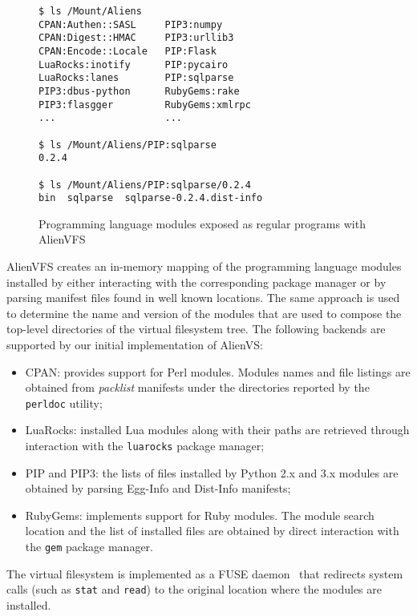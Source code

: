 \documentclass[sigplan, anonymous, 10pt]{acmart}
\begin{document}
\begin{figure}
    \begin{Verbatim}[frame=single]
$ ls /Mount/Aliens
CPAN:Authen::SASL     PIP3:numpy
CPAN:Digest::HMAC     PIP3:urllib3
CPAN:Encode::Locale   PIP:Flask
LuaRocks:inotify      PIP:pycairo
LuaRocks:lanes        PIP:sqlparse
PIP3:dbus-python      RubyGems:rake
PIP3:flasgger         RubyGems:xmlrpc
...                   ...

$ ls /Mount/Aliens/PIP:sqlparse
0.2.4

$ ls /Mount/Aliens/PIP:sqlparse/0.2.4
bin  sqlparse  sqlparse-0.2.4.dist-info
    \end{Verbatim}
    \caption{Programming language modules exposed as regular programs with AlienVFS}
    \label{fig:alienvfs}
\end{figure}

AlienVFS creates an in-memory mapping of the programming language modules installed
by either interacting with the corresponding package manager or by parsing manifest
files found in well known locations. The same approach is used to determine the
name and version of the modules that are used to compose the top-level directories
of the virtual filesystem tree. The following backends are supported by our initial
implementation of AlienVS:

\begin{itemize}
    \item CPAN: provides support for Perl modules. Modules names and file listings
        are obtained from \emph{packlist} manifests under the directories reported
        by the \texttt{perldoc} utility;
    \item LuaRocks: installed Lua modules along with their paths are retrieved
        through interaction with the \texttt{luarocks} package manager;
    \item PIP and PIP3: the lists of files installed by Python 2.x and 3.x modules
        are obtained by parsing Egg-Info and Dist-Info manifests;
    \item RubyGems: implements support for Ruby modules. The module search location
        and the list of installed files are obtained by direct interaction with the
        \texttt{gem} package manager.
\end{itemize}

The virtual filesystem is implemented as a FUSE daemon~\cite{miklos2001:fuse} that
redirects system calls (such as \texttt{stat} and \texttt{read}) to the original
location where the modules are installed.
\end{document}
